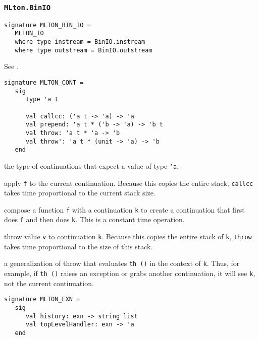 \subsubsection{{\tt MLton.BinIO}}

\begin{verbatim}
signature MLTON_BIN_IO =
   MLTON_IO
   where type instream = BinIO.instream
   where type outstream = BinIO.outstream
\end{verbatim}

See .


\begin{verbatim}
signature MLTON_CONT =
   sig
      type 'a t

      val callcc: ('a t -> 'a) -> 'a
      val prepend: 'a t * ('b -> 'a) -> 'b t
      val throw: 'a t * 'a -> 'b
      val throw': 'a t * (unit -> 'a) -> 'b
   end
\end{verbatim}

\begin{description}

the type of continuations that expect a value of type {\tt 'a}.

apply {\tt f} to the current continuation.  Because this copies the
entire stack, {\tt callcc} takes time proportional to the current
stack size.

compose a function {\tt f} with a continuation {\tt k} to create a
continuation that first does {\tt f} and then does {\tt k}.  This
is a constant time operation.

throw value {\tt v} to continuation {\tt k}.  Because this copies the
entire stack of {\tt k}, {\tt throw} takes time proportional to the
size of this stack.

a generalization of throw that evaluates {\tt th ()} in the context
of {\tt k}.  Thus, for example, if {\tt th ()} raises an exception or
grabs another continuation, it will see {\tt k}, not the current
continuation.

\end{description}

\begin{verbatim}
signature MLTON_EXN =
   sig
      val history: exn -> string list
      val topLevelHandler: exn -> 'a
   end
\end{verbatim}

